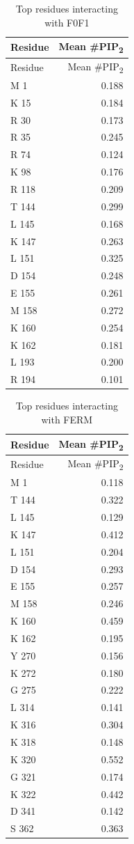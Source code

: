 \documentclass[
  twocolumn]{biophys-new-mod}
\begin{document}
\hypertarget{tbl-f0f1-top-interacting}{}
\begin{longtable}[]{@{}lr@{}}
\caption{\label{tbl-f0f1-top-interacting}Top residues interacting with
F0F1}\tabularnewline
\toprule()
Residue & Mean \#PIP\textsubscript{2} \\
\midrule()
\endfirsthead
\toprule()
Residue & Mean \#PIP\textsubscript{2} \\
\midrule()
\endhead
M 1 & 0.188 \\
K 15 & 0.184 \\
R 30 & 0.173 \\
R 35 & 0.245 \\
R 74 & 0.124 \\
K 98 & 0.176 \\
R 118 & 0.209 \\
T 144 & 0.299 \\
L 145 & 0.168 \\
K 147 & 0.263 \\
L 151 & 0.325 \\
D 154 & 0.248 \\
E 155 & 0.261 \\
M 158 & 0.272 \\
K 160 & 0.254 \\
K 162 & 0.181 \\
L 193 & 0.200 \\
R 194 & 0.101 \\
\bottomrule()
\end{longtable}

\hypertarget{tbl-ferm-top-interacting}{}
\begin{longtable}[]{@{}lr@{}}
\caption{\label{tbl-ferm-top-interacting}Top residues interacting with
FERM}\tabularnewline
\toprule()
Residue & Mean \#PIP\textsubscript{2} \\
\midrule()
\endfirsthead
\toprule()
Residue & Mean \#PIP\textsubscript{2} \\
\midrule()
\endhead
M 1 & 0.118 \\
T 144 & 0.322 \\
L 145 & 0.129 \\
K 147 & 0.412 \\
L 151 & 0.204 \\
D 154 & 0.293 \\
E 155 & 0.257 \\
M 158 & 0.246 \\
K 160 & 0.459 \\
K 162 & 0.195 \\
Y 270 & 0.156 \\
K 272 & 0.180 \\
G 275 & 0.222 \\
L 314 & 0.141 \\
K 316 & 0.304 \\
K 318 & 0.148 \\
K 320 & 0.552 \\
G 321 & 0.174 \\
K 322 & 0.442 \\
D 341 & 0.142 \\
S 362 & 0.363 \\
\bottomrule()
\end{longtable}
\end{document}
